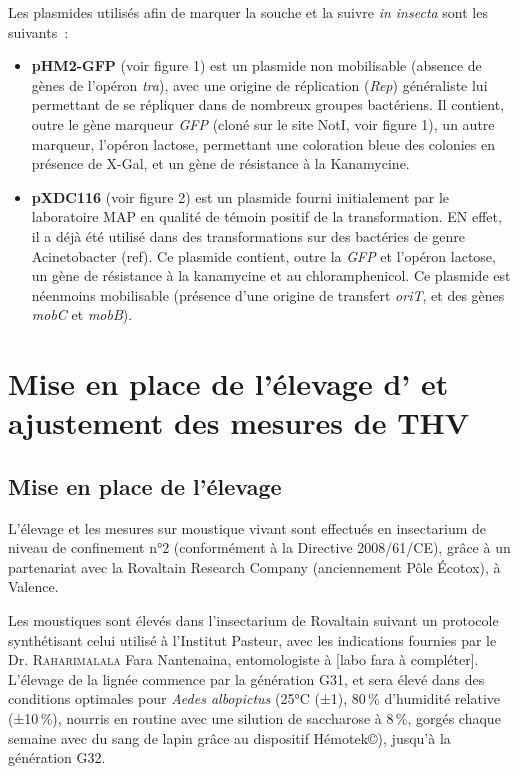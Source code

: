 Les plasmides utilisés afin de marquer la souche et la suivre \textit{in insecta} sont les suivants~:
\begin{itemize}
\item \textbf{pHM2-GFP} (voir figure 1) est un plasmide non mobilisable (absence de gènes de l'opéron \textit{tra}), avec une origine de réplication (\textit{Rep}) généraliste lui permettant de se répliquer dans de nombreux groupes bactériens. Il contient, outre le gène marqueur \textit{GFP} (cloné sur le site NotI, voir figure 1), un autre marqueur, l'opéron lactose, permettant une coloration bleue des colonies en présence de X-Gal, et un gène de résistance à la Kanamycine.
\cite{favia2007}
\item \textbf{pXDC116} (voir figure 2) est un plasmide fourni initialement par le laboratoire MAP en qualité de témoin positif de la transformation. EN effet, il a déjà été utilisé dans des transformations sur des bactéries de genre Acinetobacter (ref).
Ce plasmide contient, outre la \textit{GFP} et l'opéron lactose, un gène de résistance à la kanamycine et au chloramphenicol. Ce plasmide est néenmoins mobilisable (présence d'une origine de transfert \textit{oriT}, et des gènes \textit{mobC} et \textit{mobB}).
\end{itemize}


\section{Mise en place de l'élevage d' et ajustement des mesures de THV}

\subsection{Mise en place de l'élevage}

L'élevage et les mesures sur moustique vivant sont effectués en insectarium de niveau de confinement n°2 (conformément à la Directive 2008/61/CE), grâce à un partenariat avec la Rovaltain Research Company (anciennement Pôle Écotox), à Valence.

Les moustiques sont élevés dans l'insectarium de Rovaltain suivant un protocole synthétisant celui utilisé à l'Institut Pasteur, avec les indications fournies par le Dr. \textsc{Raharimalala} Fara Nantenaina, entomologiste à [labo fara à compléter].
L'élevage de la lignée commence par la génération G31, et sera élevé dans des conditions optimales pour \textit{Aedes albopictus} (25°C (±1), 80\,\% d'humidité relative (±10\,\%), nourris en routine avec une silution de saccharose à 8\,\%, gorgés chaque semaine avec du sang de lapin grâce au dispositif Hémotek©), jusqu'à la génération G32.

